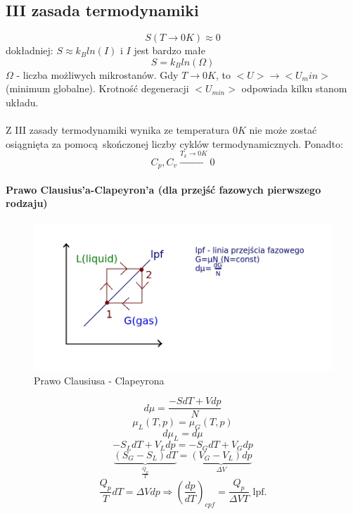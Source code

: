 \documentclass{article}
\begin{document}
		\subsection*{III zasada termodynamiki} 
		\begin{equation}
		 S(T \rightarrow 0K) \approx 0  
		\end{equation}
		dokładniej: $ S \approx k_B ln(I)$ i $ I $ jest bardzo małe \\
		\begin{equation}
		S = k_Bln(\Omega)
		\end{equation}  $ \Omega $ - liczba możliwych mikrostanów.
		Gdy $ T \rightarrow 0K$, to $ <U> \rightarrow <U_min> $ (minimum globalne). Krotność degeneracji $ <U_{min}> $ odpowiada kilku stanom układu.
		\paragraph{} Z III zasady termodynamiki wynika ze temperatura $ 0K $ nie może zostać osiągnięta za pomocą skończonej liczby cyklów termodynamicznych. Ponadto: 
		\begin{equation}
		C_p,C_v \xrightarrow{T_k \rightarrow 0K} 0
		\end{equation}
		\paragraph{Prawo Clausius'a-Clapeyron'a (dla przejść fazowych pierwszego rodzaju)}
		\begin{figure}[ht]
			\label{fig:fig1}
			\centering
			\includegraphics[scale=0.5]{clausius.jpeg}
			\caption{Prawo Clausiusa - Clapeyrona}
		\end{figure}
		\begin{equation}
		d\mu = \frac{-SdT+Vdp}{N}
		\end{equation}
		\begin{equation}
		\mu_L(T,p) = \mu_G(T,p)
		\end{equation}
		\begin{equation}
		d\mu_L = d\mu
		\end{equation}
		\begin{equation}
		-S_LdT + V_Ldp = -S_GdT + V_Gdp
		\end{equation}
		\begin{equation}
		\underbrace{(S_G - S_L)dT}_{\frac{Q_p}{T}} = \underbrace{(V_G - V_L)dp}_{\Delta V} 
		\end{equation}
		\begin{equation}
		\frac{Q_p}{T}dT = \Delta Vdp \Rightarrow (\frac{dp}{dT})_{cpf} = 
		\frac{Q_p}{\Delta VT} \text{  lpf.}
		\end{equation}
\end{document}

